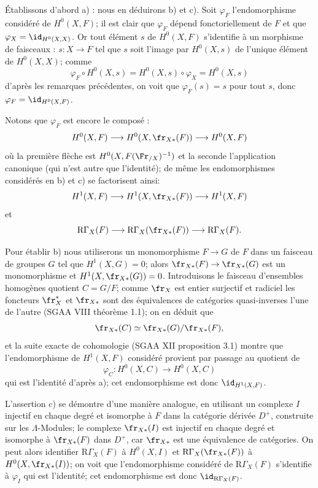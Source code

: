 Établissons d'abord a) : nous en déduirons b) et c). Soit $\varphi_F$ l'endomorphisme considéré de $H^0(X,F)$; il est clair que $\varphi_F$ dépend fonctoriellement de $F$ et que $\varphi_X=\id_{H^0(X,X)}$. Or tout élément $s$ de $H^0(X,F)$ s'identifie à un morphisme de faisceaux : $s:X\to F$ tel que $s$ soit l'image par $H^0(X,s)$ de l'unique élément de $H^0(X,X)$; comme
\[
\varphi_F\circ H^0(X,s)=H^0(X,s)\circ\varphi_X=H^0(X,s)
\]
d'après les remarques précédentes, on voit que $\varphi_F(s)=s$ pour tout $s$, donc $\varphi_F=\id_{H^0(X,F)}$.

Notons que $\varphi_F$ est encore le composé :
\[
H^0(X,F)\longrightarrow H^0(X,\fr_{X*}(F))
\longrightarrow H^0(X,F)
\]
où la première flèche est $H^0(X,F(\Fr_{/X})^{-1})$ et la seconde l'application canonique (qui n'est autre que l'identité); de même les endomorphismes considérés en b) et c) se factorisent ainsi:
\[
H^1(X,F)\longrightarrow H^1(X,\fr_{X*}(F))
\longrightarrow H^1(X,F)
\]
et
\[
\mathrm{R}\Gamma_X(F)\longrightarrow \mathrm{R}\Gamma_X(\fr_{X*}(F))
\longrightarrow \mathrm{R}\Gamma_X(F).
\]

Pour établir b) nous utiliserons un monomorphisme $F\to G$ de $F$ dans un faisceau de groupes $G$ tel que $H^1(X,G)=0$; alors $\fr_{X*}(F)\to\fr_{X*}(G)$ est un monomorphisme et $H^1(X,\fr_{X*}(G))=0$. Introduisons le faisceau d'ensembles homogènes quotient $C=G/F$;
comme $\fr_X$ est entier surjectif et radiciel les foncteurs $\fr_X^*$ et $\fr_{X*}$ sont des équivalences de catégories quasi-inverses l'une de l'autre (SGAA VIII théorème 1.1); on en déduit que
\[
\fr_{X*}(C)\simeq\fr_{X*}(G)/\fr_{X*}(F),
\]
et la suite exacte de cohomologie (SGAA XII proposition 3.1) montre que l'endomorphisme de $H^1(X,F)$ considéré provient par passage au quotient de
\[
\varphi_C:H^0(X,C)\longrightarrow H^0(X,C)
\]
qui est l'identité d'après a); cet endomorphisme est donc $\id_{H^1(X,F)}$.

L'assertion c) se démontre d'une manière analogue, en utilisant un complexe $I$ injectif en chaque degré et isomorphe à $F$ dans la catégorie dérivée $D^+$, construite sur les $\Lambda$-Modules; le complexe $\fr_{X*}(I)$ est injectif en chaque degré et isomorphe à $\fr_{X*}(F)$ dans $D^+$, car $\fr_{X*}$ est une équivalence de catégories. On peut alors identifier $\mathrm{R}\Gamma_X(F)$ à $H^0(X,I)$ et $\mathrm{R}\Gamma_X(\fr_{X*}(F))$ à $H^0(X,\fr_{X*}(I))$; on voit que l'endomorphisme considéré de $\mathrm{R}\Gamma_X(F)$ s'identifie à $\varphi_I$ qui est l'identité; cet endomorphisme est donc $\id_{\mathrm{R}\Gamma_X(F)}$.

